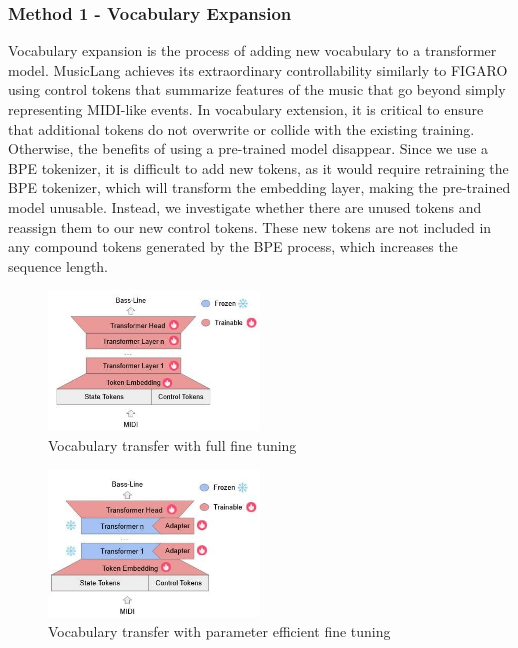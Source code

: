 \subsubsection{Method 1 - Vocabulary Expansion}

Vocabulary expansion is the process of adding new vocabulary to a transformer model. MusicLang achieves its extraordinary controllability similarly to FIGARO \cite{Rütte_figaro_2023} using control tokens that summarize features of the music that go beyond simply representing MIDI-like events. In vocabulary extension, it is critical to ensure that additional tokens do not overwrite or collide with the existing training. Otherwise, the benefits of using a pre-trained model disappear. Since we use a BPE tokenizer, it is difficult to add new tokens, as it would require retraining the BPE tokenizer, which will transform the embedding layer, making the pre-trained model unusable. Instead, we investigate whether there are unused tokens and reassign them to our new control tokens. These new tokens are not included in any compound tokens generated by the BPE process, which increases the sequence length.

\begin{figure}[H]
\centering
\includegraphics[width=0.5\textwidth]{IMAGES/full_ft.jpg}
\caption{Vocabulary transfer with full fine tuning}
\label{fig:vocabtrans1}
\end{figure}

\begin{figure}[H]
\centering
\includegraphics[width=0.5\textwidth]{IMAGES/vocab_lora_ft.jpg} 
\caption{Vocabulary transfer with parameter efficient fine tuning}
\label{fig:vocabtrans2}
\end{figure}

